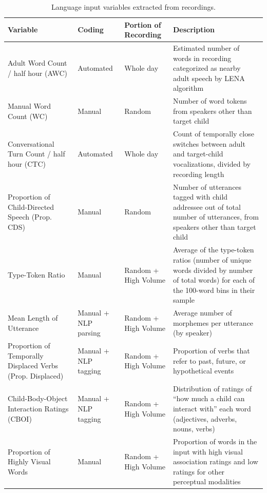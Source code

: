 \documentclass[
  man,floatsintext]{apa6}
\begin{document}
\begin{table}

\caption{\label{tab:variables-table}Language input variables extracted from recordings.}
\centering
\fontsize{9}{11}\selectfont
\begin{tabular}[t]{>{\raggedright\arraybackslash}p{1.4in}|>{\centering\arraybackslash}p{.8in}|>{\centering\arraybackslash}p{.75in}|>{\raggedright\arraybackslash}p{2.8in}}
\hline
Variable & Coding & Portion of Recording & Description\\
\hline
Adult Word Count / half hour (AWC) & Automated & Whole day & Estimated number of words in recording categorized as nearby adult speech by LENA algorithm\\
\hline
Manual Word Count (WC) & Manual & Random & Number of word tokens from speakers other than target child\\
\hline
Conversational Turn Count / half hour (CTC) & Automated & Whole day & Count of temporally close switches between adult and target-child vocalizations, divided by recording length\\
\hline
Proportion of Child-Directed Speech (Prop. CDS) & Manual & Random & Number of utterances tagged with child addressee out of total number of utterances, from speakers other than target child\\
\hline
Type-Token Ratio & Manual & Random + High Volume & Average of the type-token ratios (number of unique words divided by number of total words) for each of the 100-word bins in their sample\\
\hline
Mean Length of Utterance & Manual + NLP parsing & Random + High Volume & Average number of morphemes per utterance (by speaker)\\
\hline
Proportion of Temporally Displaced Verbs (Prop. Displaced) & Manual + NLP tagging & Random + High Volume & Proportion of verbs that refer to past, future, or hypothetical events\\
\hline
Child-Body-Object Interaction Ratings (CBOI) & Manual + NLP tagging & Random + High Volume & Distribution of ratings of “how much a child can interact with” each word (adjectives, adverbs, nouns, verbs)\\
\hline
Proportion of Highly Visual Words & Manual & Random + High Volume & Proportion of words in the input with high visual association ratings and low ratings for other perceptual modalities\\
\hline
\end{tabular}
\end{table}
\end{document}
